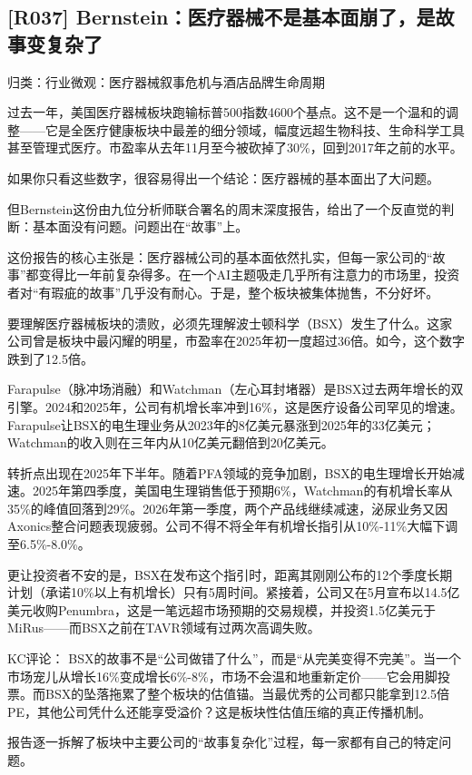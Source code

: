 \documentclass[11pt]{ctexart}
\begin{document}
\subsection{[R037] Bernstein：医疗器械不是基本面崩了，是故事变复杂了}
{\small\color{refgray}归类：行业微观：医疗器械叙事危机与酒店品牌生命周期}

过去一年，美国医疗器械板块跑输标普500指数4600个基点。这不是一个温和的调整——它是全医疗健康板块中最差的细分领域，幅度远超生物科技、生命科学工具甚至管理式医疗。市盈率从去年11月至今被砍掉了30\%，回到2017年之前的水平。

如果你只看这些数字，很容易得出一个结论：医疗器械的基本面出了大问题。

但Bernstein这份由九位分析师联合署名的周末深度报告，给出了一个反直觉的判断：基本面没有问题。问题出在“故事”上。

这份报告的核心主张是：医疗器械公司的基本面依然扎实，但每一家公司的“故事”都变得比一年前复杂得多。在一个AI主题吸走几乎所有注意力的市场里，投资者对“有瑕疵的故事”几乎没有耐心。于是，整个板块被集体抛售，不分好坏。

要理解医疗器械板块的溃败，必须先理解波士顿科学（BSX）发生了什么。这家公司曾是板块中最闪耀的明星，市盈率在2025年初一度超过36倍。如今，这个数字跌到了12.5倍。

Farapulse（脉冲场消融）和Watchman（左心耳封堵器）是BSX过去两年增长的双引擎。2024和2025年，公司有机增长率冲到16\%，这是医疗设备公司罕见的增速。Farapulse让BSX的电生理业务从2023年的8亿美元暴涨到2025年的33亿美元；Watchman的收入则在三年内从10亿美元翻倍到20亿美元。

转折点出现在2025年下半年。随着PFA领域的竞争加剧，BSX的电生理增长开始减速。2025年第四季度，美国电生理销售低于预期6\%，Watchman的有机增长率从35\%的峰值回落到29\%。2026年第一季度，两个产品线继续减速，泌尿业务又因Axonics整合问题表现疲弱。公司不得不将全年有机增长指引从10\%-11\%大幅下调至6.5\%-8.0\%。

更让投资者不安的是，BSX在发布这个指引时，距离其刚刚公布的12个季度长期计划（承诺10\%以上有机增长）只有5周时间。紧接着，公司又在5月宣布以14.5亿美元收购Penumbra，这是一笔远超市场预期的交易规模，并投资1.5亿美元于MiRus——而BSX之前在TAVR领域有过两次高调失败。

KC评论： BSX的故事不是“公司做错了什么”，而是“从完美变得不完美”。当一个市场宠儿从增长16\%变成增长6\%-8\%，市场不会温和地重新定价——它会用脚投票。而BSX的坠落拖累了整个板块的估值锚。当最优秀的公司都只能拿到12.5倍PE，其他公司凭什么还能享受溢价？这是板块性估值压缩的真正传播机制。

报告逐一拆解了板块中主要公司的“故事复杂化”过程，每一家都有自己的特定问题。
\end{document}
